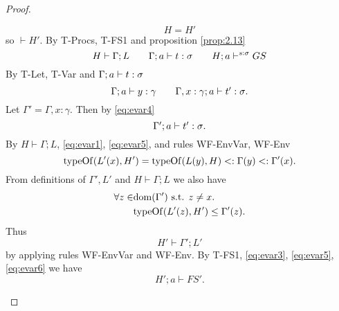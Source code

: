 \begin{proof}
\begin{description}
\begin{description}
\begin{description}
\begin{equation}
                H = H'
              \end{equation}
              so $\vdash H'$.
              By {\sc T-Procs}, {\sc T-FS1} and proposition \ref{prop:2.13}
              \begin{equation} \label{eq:evar3}
                H \vdash \Gamma; L \quad\quad \mbox{$\Gamma;a\vdash t:\sigma$}
                \quad\quad H; a \vdash^{s: \sigma} GS
              \end{equation}
              By {\sc T-Let, T-Var} and $\mbox{$\Gamma;a\vdash t:\sigma$}$
              \begin{equation} \label{eq:evar4}
                \mbox{$\Gamma;a\vdash y:\gamma$} \quad\quad \mbox{$\Gamma, x:
                \gamma;a\vdash t':\sigma$}.
              \end{equation}
              Let $\Gamma' = \Gamma, x: \gamma$.
              Then by \eqref{eq:evar4}
              \begin{equation} \label{eq:evar5}
                \mbox{$\Gamma';a\vdash t':\sigma$}.
              \end{equation}
              By $H \vdash \Gamma; L$, \eqref{eq:evar1}, \eqref{eq:evar5}, and
              rules {\sc WF-EnvVar}, {\sc WF-Env}
              \begin{equation*}
                \mbox{$\mathrm{typeOf}$}(L'(x), H') = \mbox{$\mathrm{typeOf}$}(L(y), H) <: \Gamma(y) <:
                \Gamma'(x).
              \end{equation*}
              From definitions of $\Gamma', L'$ and $H \vdash \Gamma;L$ we also have 
              \begin{equation*}
                \begin{aligned}
                  \forall z \in &\mbox{$\mathrm{dom}$}(\Gamma') \text{ s.t. } z \neq x. \\
                  & \mbox{$\mathrm{typeOf}$}(L'(z), H') \leq \Gamma'(z).
                \end{aligned}
              \end{equation*}
              Thus
              \begin{equation} \label{eq:evar6}
                H' \vdash \Gamma'; L'
              \end{equation}
              by applying rules {\sc WF-EnvVar} and {\sc WF-Env}.
              By {\sc T-FS1}, \eqref{eq:evar3}, \eqref{eq:evar5},
              \eqref{eq:evar6} we have
              \begin{equation} \label{eq:evar7}
                H'; a \vdash FS'.
              \end{equation}

\end{description}
\end{description}
\end{description}
\end{proof}
